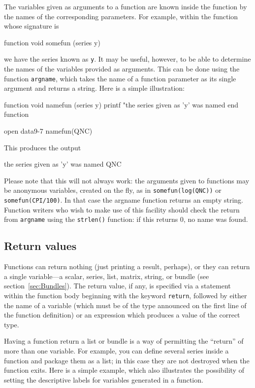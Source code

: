 The variables given as arguments to a function are known inside the
function by the names of the corresponding parameters.  For example,
within the function whose signature is
%
\begin{code}
function void somefun (series y)
\end{code}
%
we have the series known as \texttt{y}.  It may be useful, however, to
be able to determine the names of the variables provided as arguments.
This can be done using the function \texttt{argname}, which takes the
name of a function parameter as its single argument and returns a
string.  Here is a simple illustration:
%
\begin{code}
function void namefun (series y)
  printf "the series given as 'y' was named %
end function

open data9-7
namefun(QNC)
\end{code}
%
This produces the output
%
\begin{code}
the series given as 'y' was named QNC
\end{code}

Please note that this will not always work: the arguments given
to functions may be anonymous variables, created on the fly, as in
\texttt{somefun(log(QNC))} or \texttt{somefun(CPI/100)}.  In that case
the \textsf{argname} function returns an empty string.  Function
writers who wish to make use of this facility should check the return
from \texttt{argname} using the \texttt{strlen()} function: if this
returns 0, no name was found.

\subsection{Return values}

Functions can return nothing (just printing a result, perhaps), or
they can return a single variable---a scalar, series, list, matrix,
string, or bundle (see section~\ref{sec:Bundles}).  The return value,
if any, is specified via a statement within the function body
beginning with the keyword \texttt{return}, followed by either the
name of a variable (which must be of the type announced on the first
line of the function definition) or an expression which produces a
value of the correct type.

Having a function return a list or bundle is a way of permitting the
``return'' of more than one variable.  For example, you can define
several series inside a function and package them as a list; in this
case they are not destroyed when the function exits.  Here is a simple
example, which also illustrates the possibility of setting the
descriptive labels for variables generated in a function.
%    

